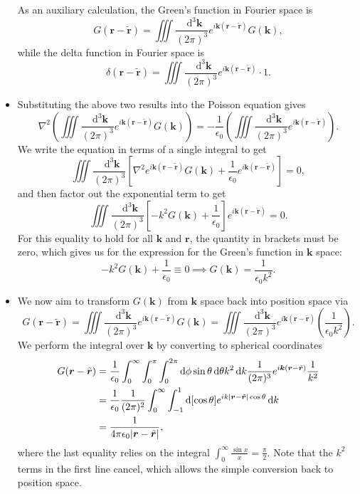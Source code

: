 \documentclass[11pt, a4paper]{article}
\newcommand{\diff}{\mathop{}\!\mathrm{d}} %
\newcommand{\dk}{\diff^{3} \vec{k}}  %
\renewcommand{\vec}[1]{\bm{#1}} %
\renewcommand{\t}[1]{\tilde{#1}} %
\renewcommand{\r}{\vec{r}}
\renewcommand{\k}{\vec{k}}
\newcommand{\ee}{\epsilon_{0}}  %
\renewcommand{\laplacian}{\nabla^{2}}
\begin{document}
\begin{itemize}
	As an auxiliary calculation, the Green's function in Fourier space is
	\begin{equation*}
		G(\r - \t{\r}) = \iiint \frac{\dk}{(2\pi)^{3}}e^{i\k(\r - \t{\r})}G(\k),
	\end{equation*}
	while the delta function in Fourier space is
	\begin{equation*}
		\delta(\r - \t{\r}) = \iiint \frac{\dk}{(2\pi)^{3}}e^{i\k(\r - \t{\r})}\cdot 1.
	\end{equation*}
	
    \item Substituting the above two results into the Poisson equation gives
	\begin{equation*}
		\laplacian \left(\iiint \frac{\dk}{(2\pi)^{3}} e^{i\k(\r - \t{\r})} G(\k)\right) = -\frac{1}{\ee} \left(\iiint \frac{\dk}{(2\pi)^{3}}e^{i\k(\r - \t{\r})} \right).
	\end{equation*}
	We write the equation in terms of a single integral to get
	\begin{equation*}
		\iiint \frac{\dk}{(2\pi)^{3}} \left[\laplacian e^{i\k(\r - \t{\r})}G(\k) + \frac{1}{\ee}e^{i\k(\r - \t{\r})}\right] = 0,
	\end{equation*}
	and then factor out the exponential term to get
	\begin{equation*}
		\iiint \frac{\dk}{(2\pi)^{3}} \left[-k^{2} G(\k) + \frac{1}{\ee}\right]e^{i\k(\r - \t{\r})} = 0.
	\end{equation*}
	For this equality to hold for all $ \k $ and $ \r $, the quantity in brackets must be zero, which gives us for the expression for the Green's function in $ \k $ space:
	\begin{equation*}
		-k^{2} G(\k) + \frac{1}{\ee} \equiv 0 \implies G(\k) = \frac{1}{\ee k^{2}}.
	\end{equation*}
	
	\item We now aim to transform $ G(\k) $ from $ \k $ space back into position space via
	\begin{equation*}
		G(\r - \t{\r}) = \iiint \frac{\dk}{(2\pi)^{3}}e^{i\k(\r - \t{\r})}G(\k) = \iiint \frac{\dk}{(2\pi)^{3}}e^{i\k(\r - \t{\r})}\left(\frac{1}{\ee k^{2}}\right).
	\end{equation*}
	We perform the integral over $ \k $ by converting to spherical coordinates
	\begin{align*}
		G(\r - \t{\r}) &= \frac{1}{\ee}\int_{0}^{\infty} \int_{0}^{\pi} \int_{0}^{2\pi} \diff \phi \sin \theta \diff \theta k^{2} \diff k \frac{1}{(2\pi)^{3}}e^{i\k(\r - \t{\r})} \frac{1}{k^{2}} \\
		& = \frac{1}{\ee}\frac{1}{(2\pi)^{2}}\int_{0}^{\infty} \int_{-1}^{1} \diff [\cos \theta]  e^{ik\abs{\r - \t{\r}}\cos \theta} \diff k\\
		& = \frac{1}{4\pi \ee \abs{\r - \t{\r}}},
	\end{align*}
	where the last equality relies on the integral $ \int_{0}^{\infty}\frac{\sin x}{x} = \frac{\pi}{2} $. Note that the $ k^{2} $ terms in the first line cancel, which allows the simple conversion back to position space.
	

\end{itemize}
\end{document}
